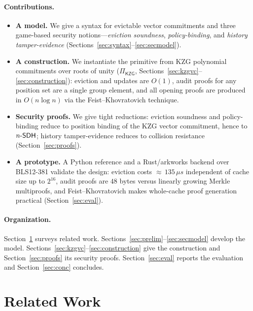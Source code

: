 \paragraph{Contributions.}
\begin{itemize}[leftmargin=1.4em,itemsep=2pt]
  \item \textbf{A model.} We give a syntax for evictable vector commitments and
        three game-based security notions---\emph{eviction soundness},
        \emph{policy-binding}, and \emph{history tamper-evidence}
        (Sections~\ref{sec:syntax}--\ref{sec:secmodel}).
  \item \textbf{A construction.} We instantiate the primitive from KZG
        polynomial commitments over roots of unity ($\Pi_{\mathsf{KZG}}$,
        Sections~\ref{sec:kzgvc}--\ref{sec:construction}): eviction and updates
        are $O(1)$, audit proofs for any position set are a single group
        element, and all opening proofs are produced in $O(n\log n)$ via the
        Feist--Khovratovich technique.
  \item \textbf{Security proofs.} We give tight reductions: eviction soundness
        and policy-binding reduce to position binding of the KZG vector
        commitment, hence to $n\text{-}\mathsf{SDH}$; history tamper-evidence reduces to
        collision resistance (Section~\ref{sec:proofs}).
  \item \textbf{A prototype.} A Python reference and a Rust/arkworks backend over
        BLS12-381 validate the design: eviction costs ${\approx}\,135\,\mu s$
        independent of cache size up to $2^{16}$, audit proofs are $48$ bytes
        versus linearly growing Merkle multiproofs, and Feist--Khovratovich makes
        whole-cache proof generation practical (Section~\ref{sec:eval}).
\end{itemize}

\paragraph{Organization.}
Section~\ref{sec:related} surveys related work. Sections~\ref{sec:prelim}--\ref{sec:secmodel}
develop the model. Sections~\ref{sec:kzgvc}--\ref{sec:construction} give the
construction and Section~\ref{sec:proofs} its security proofs.
Section~\ref{sec:eval} reports the evaluation and Section~\ref{sec:conc}
concludes.

\section{Related Work}\label{sec:related}


